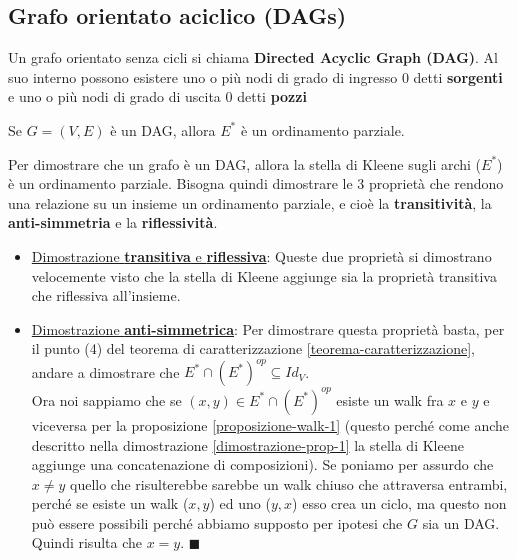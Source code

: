 \subsection{Grafo orientato aciclico (DAGs)}
\begin{definition}
    Un grafo orientato senza cicli si chiama \textbf{Directed Acyclic Graph (DAG)}. Al suo interno possono esistere uno o più nodi di grado di ingresso $0$ detti \textbf{sorgenti} e uno o più nodi di grado di uscita $0$ detti \textbf{pozzi}
\end{definition}

\begin{proposition}
    Se $G = (V,E)$ è un DAG, allora $E^*$ è un ordinamento parziale.
\end{proposition}
\begin{demostration}
Per dimostrare che un grafo è un DAG, allora la stella di Kleene sugli archi ($E^*$) è un ordinamento parziale. Bisogna quindi dimostrare le 3 proprietà che rendono una relazione su un insieme un ordinamento parziale, e cioè la \textbf{transitività}, la \textbf{anti-simmetria} e la \textbf{riflessività}.
\begin{itemize}
    \item \underline{Dimostrazione \textbf{transitiva} e \textbf{riflessiva}}: Queste due proprietà si dimostrano velocemente visto che la stella di Kleene aggiunge sia la proprietà transitiva che riflessiva all'insieme.
    \item \underline{Dimostrazione \textbf{anti-simmetrica}}: Per dimostrare questa proprietà basta, per il punto (4) del teorema di caratterizzazione \ref{teorema-caratterizzazione}, andare a dimostrare che $E^* \cap (E^*)^{op} \subseteq Id_V$.\\
    Ora noi sappiamo che se $(x,y) \in E^* \cap (E^*)^{op}$ esiste un walk fra $x$ e $y$ e viceversa per la proposizione \ref{proposizione-walk-1} (questo perché come anche descritto nella dimostrazione \ref{dimostrazione-prop-1} la stella di Kleene aggiunge una concatenazione di composizioni). Se poniamo per assurdo che $x \neq y$ quello che risulterebbe sarebbe un walk chiuso che attraversa entrambi, perché se esiste un walk ($x,y$) ed uno ($y, x$) esso crea un ciclo, ma questo non può essere possibili perché abbiamo supposto per ipotesi che $G$ sia un DAG. Quindi risulta che $x = y$. $\blacksquare$
\end{itemize}
\end{demostration}

